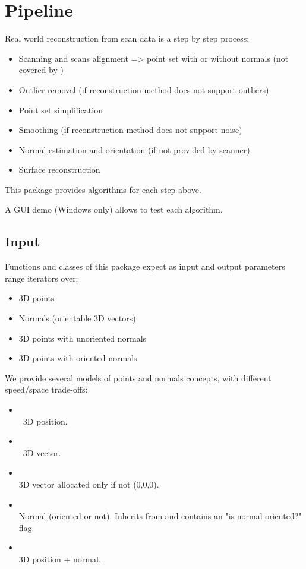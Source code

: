 \section{Pipeline}

Real world reconstruction from scan data is a step by step process:

\begin{itemize}
\item Scanning and scans alignment => point set with or without normals (not covered by \cgal)
\item Outlier removal (if reconstruction method does not support outliers)
\item Point set simplification
\item Smoothing (if reconstruction method does not support noise)
\item Normal estimation and orientation (if not provided by scanner)
\item Surface reconstruction
\end{itemize}

This package provides algorithms for each step above.

A GUI demo (Windows only) allows to test each algorithm.


\subsection{Input}

Functions and classes of this package expect as input and output parameters range iterators over:

\begin{itemize}
\item 3D points
\item Normals (orientable 3D vectors)
\item 3D points with unoriented normals
\item 3D points with oriented normals
\end{itemize}

We provide several models of points and normals concepts, with different speed/space trade-offs:

\begin{itemize}
\item {} \\
\cgal\ 3D position.
\item {} \\
\cgal\ 3D vector.
\item {} \\
3D vector allocated only if not (0,0,0).
\item {} \\
Normal (oriented or not).
Inherits from  and contains an "is normal oriented?" flag.
\item {} \\
3D position + normal.
\end{itemize}

